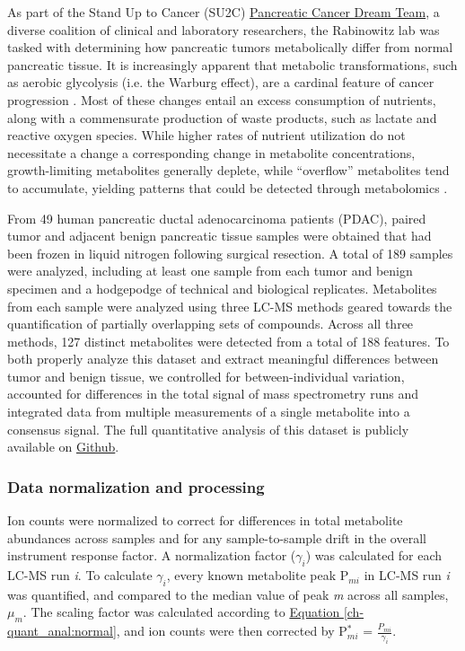 As part of the Stand Up to Cancer (SU2C) \href{http://www.standup2cancer.org/dream_team_members#Pancreatic}{Pancreatic Cancer Dream Team}, a diverse coalition of clinical and laboratory researchers, the Rabinowitz lab was tasked with determining how pancreatic tumors metabolically differ from normal pancreatic tissue.  It is increasingly apparent that metabolic transformations, such as aerobic glycolysis (i.e. the Warburg effect), are a cardinal feature of cancer progression \cite{VanderHeiden:2009gq, Hanahan:2011gu}.  Most of these changes entail an excess consumption of nutrients, along with a commensurate production of waste products, such as lactate and reactive oxygen species.  While higher rates of nutrient utilization do not necessitate a change a corresponding change in metabolite concentrations, growth-limiting metabolites generally deplete, while ``overflow'' metabolites tend to accumulate, yielding patterns that could be detected through metabolomics \cite{Boer:2010fb}.

From 49 human pancreatic ductal adenocarcinoma patients (PDAC), paired tumor and adjacent benign pancreatic tissue samples were obtained that had been frozen in liquid nitrogen following surgical resection.  A total of 189 samples were analyzed, including at least one sample from each tumor and benign specimen and a hodgepodge of technical and biological replicates.  Metabolites from each sample were analyzed using three LC-MS methods geared towards the quantification of partially overlapping sets of compounds. Across all three methods, 127 distinct metabolites were detected from a total of 188 features.  To both properly analyze this dataset and extract meaningful differences between tumor and benign tissue, we controlled for between-individual variation, accounted for differences in the total signal of mass spectrometry runs and integrated data from multiple measurements of a single metabolite into a consensus signal. The full quantitative analysis of this dataset is publicly available on \href{https://github.com/shackett/Pancreatic_tumor_metabolomics}{Github}.

\subsubsection{Data normalization and processing}

Ion counts were normalized to correct for differences in total metabolite abundances across samples and for any sample-to-sample drift in the overall instrument response factor.  A normalization factor ($\gamma_{i}$) was calculated for each LC-MS run \textit{i}.  To calculate $\gamma_{i}$, every known metabolite peak P$_{mi}$ in LC-MS run \textit{i} was quantified, and compared to the median value of peak \textit{m} across all samples, $\mu_{m}$.  The scaling factor was calculated according to \hyperref[ch-quant_anal:normal]{Equation \ref{ch-quant_anal:normal}}, and ion counts were then corrected by P$^{*}_{mi}$ = $\frac{P_{mi}}{\gamma_{i}}$.

